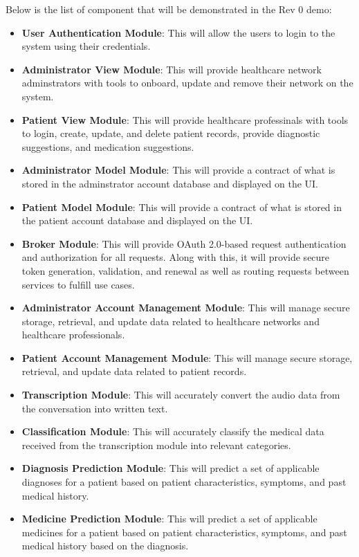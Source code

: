 \documentclass{article}
\begin{document}
Below is the list of component that will be demonstrated in the Rev 0 demo:
\begin{itemize}
  \item \textbf{User Authentication Module}: This will allow the users to login to the system using their credentials.
  \item \textbf{Administrator View Module}: This will provide healthcare network adminstrators with tools to onboard, update and remove their network on the system. 
  \item \textbf{Patient View Module}: This will provide healthcare professinals with tools to login, create, update, and delete patient records, provide diagnostic suggestions, and medication suggestions. 
  \item \textbf{Administrator Model Module}: This will provide a contract of what is stored in the adminstrator account database and displayed on the UI.
  \item \textbf{Patient Model Module}: This will provide a contract of what is stored in the patient account database and displayed on the UI.
  \item \textbf{Broker Module}: This will provide OAuth 2.0-based request authentication and authorization for all requests. Along with this, it will provide secure token generation, validation, and renewal as well as routing requests between services to fulfill use cases.
  \item \textbf{Administrator Account Management Module}: This will manage secure storage, retrieval, and update data related to healthcare networks and healthcare professionals.
  \item \textbf{Patient Account Management Module}: This will manage secure storage, retrieval, and update data related to patient records.
  \item \textbf{Transcription Module}: This will accurately convert the audio data from the conversation into written text.
  \item \textbf{Classification Module}: This will accurately classify the medical data received from the transcription module into relevant categories.
  \item \textbf{Diagnosis Prediction Module}: This will predict a set of applicable diagnoses for a patient based on patient characteristics, symptoms, and past medical history.
  \item \textbf{Medicine Prediction Module}: This will predict a set of applicable medicines for a patient based on patient characteristics, symptoms, and past medical history based on the diagnosis.
\end{itemize}
\end{document}
